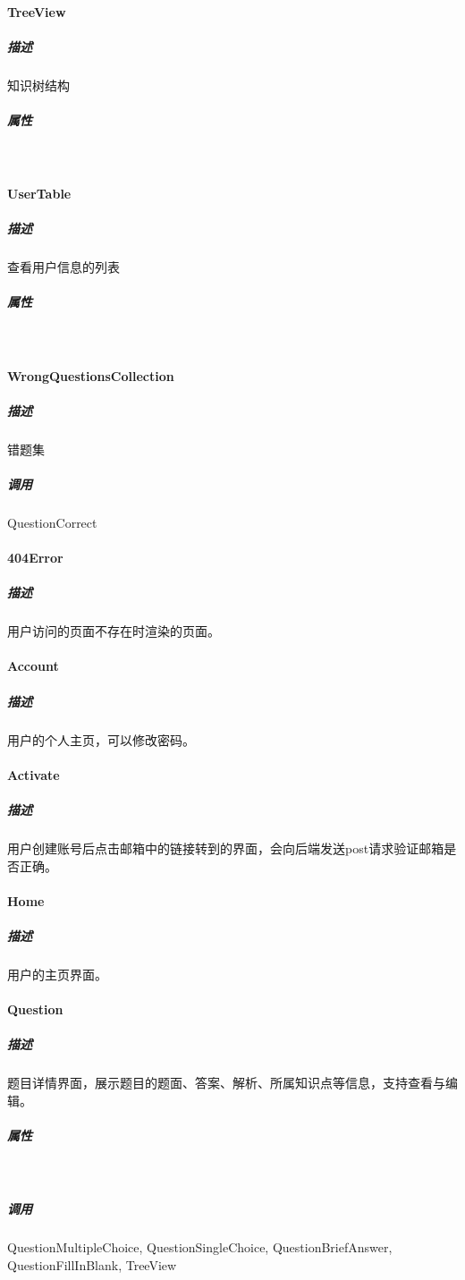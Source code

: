 \documentclass{article}
\begin{document}
        \paragraph{TreeView}
            \subparagraph{描述}
                知识树结构
            \subparagraph{属性}\ \par
                
        \paragraph{UserTable}
            \subparagraph{描述}
                查看用户信息的列表
            \subparagraph{属性}\ \par
                
        \paragraph{WrongQuestionsCollection}
            \subparagraph{描述}
                错题集
            \subparagraph{调用}
                QuestionCorrect

        \paragraph{404Error}
            \subparagraph{描述}
                用户访问的页面不存在时渲染的页面。
        \paragraph{Account}
            \subparagraph{描述}
                用户的个人主页，可以修改密码。
        \paragraph{Activate}
            \subparagraph{描述}
                用户创建账号后点击邮箱中的链接转到的界面，会向后端发送post请求验证邮箱是否正确。
        \paragraph{Home}
            \subparagraph{描述}
                用户的主页界面。
        \paragraph{Question}
            \subparagraph{描述}
                题目详情界面，展示题目的题面、答案、解析、所属知识点等信息，支持查看与编辑。
            \subparagraph{属性}\ \par
            \subparagraph{调用}
                QuestionMultipleChoice, QuestionSingleChoice, QuestionBriefAnswer, QuestionFillInBlank, TreeView
\end{document}

